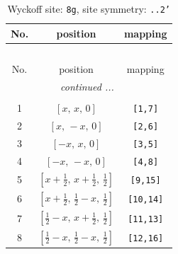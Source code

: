 \documentclass[fleqn,8pt]{jsarticle}
\begin{document}
\renewcommand{\arraystretch}{1.2}
\begin{longtable}{ccc}
\caption{Wyckoff site: {\tt 8g}, site symmetry: {\tt ..2'}}
 \\
 \hline \hline
No. & position & mapping \\ \hline \endfirsthead

\multicolumn{2}{l}{\tablename\ \thetable{}} \\
 \hline \hline
No. & position & mapping \\ \hline \endhead

 \hline \hline
\multicolumn{2}{r}{\footnotesize\it continued ...} \\ \endfoot

 \hline \hline
\multicolumn{2}{r}{} \\ \endlastfoot

1 & $\left[ x,\, x,\, 0 \right]$ & {\tt [1,7]} \\ \hline
2 & $\left[ x,\, - x,\, 0 \right]$ & {\tt [2,6]} \\ \hline
3 & $\left[ - x,\, x,\, 0 \right]$ & {\tt [3,5]} \\ \hline
4 & $\left[ - x,\, - x,\, 0 \right]$ & {\tt [4,8]} \\ \hline
5 & $\left[ x + \frac{1}{2},\, x + \frac{1}{2},\, \frac{1}{2} \right]$ & {\tt [9,15]} \\ \hline
6 & $\left[ x + \frac{1}{2},\, \frac{1}{2} - x,\, \frac{1}{2} \right]$ & {\tt [10,14]} \\ \hline
7 & $\left[ \frac{1}{2} - x,\, x + \frac{1}{2},\, \frac{1}{2} \right]$ & {\tt [11,13]} \\ \hline
8 & $\left[ \frac{1}{2} - x,\, \frac{1}{2} - x,\, \frac{1}{2} \right]$ & {\tt [12,16]} \\
\end{longtable}
\renewcommand{\arraystretch}{1.2}
\end{document}
